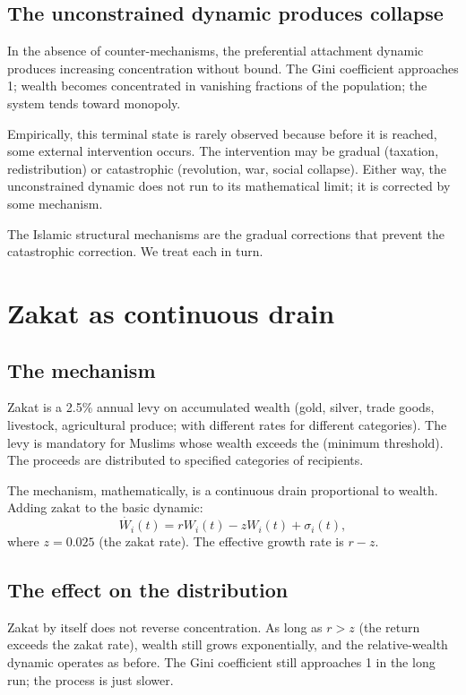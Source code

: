 \subsection{The unconstrained dynamic produces collapse}

In the absence of counter-mechanisms, the preferential attachment
dynamic produces increasing concentration without bound. The Gini
coefficient approaches 1; wealth becomes concentrated in vanishing
fractions of the population; the system tends toward monopoly.

Empirically, this terminal state is rarely observed because before
it is reached, some external intervention occurs. The intervention
may be gradual (taxation, redistribution) or catastrophic
(revolution, war, social collapse). Either way, the unconstrained
dynamic does not run to its mathematical limit; it is corrected by
some mechanism.

The Islamic structural mechanisms are the gradual corrections that
prevent the catastrophic correction. We treat each in turn.

\section{Zakat as continuous drain}
\label{sec:perm-zakat}

\subsection{The mechanism}

Zakat is a 2.5\% annual levy on accumulated wealth (gold, silver,
trade goods, livestock, agricultural produce; with different rates
for different categories). The levy is mandatory for Muslims whose
wealth exceeds the  (minimum threshold). The proceeds
are distributed to specified categories of recipients.

The mechanism, mathematically, is a continuous drain proportional
to wealth. Adding zakat to the basic dynamic:
\[
    \dot{W_i}(t) = r W_i(t) - z W_i(t) + \sigma_i(t),
\]
where $z = 0.025$ (the zakat rate). The effective growth rate is
$r - z$.

\subsection{The effect on the distribution}

Zakat by itself does not reverse concentration. As long as $r > z$
(the return exceeds the zakat rate), wealth still grows
exponentially, and the relative-wealth dynamic operates as before.
The Gini coefficient still approaches 1 in the long run; the
process is just slower.

